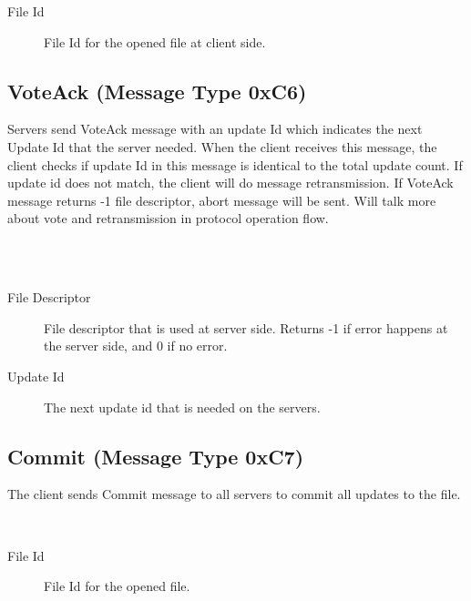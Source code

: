 \documentclass[12pt,fleqn]{article}
\begin{document}
\begin{description}
	\item[File Id] File Id for the opened file at client side.
\end{description}

\subsection{VoteAck (Message Type 0xC6)}
Servers send VoteAck message with an update Id which indicates the next Update Id that the server needed. When the client receives this message, the client checks if update Id in this message is identical to the total update count. If update id does not match, the client will do message retransmission. If VoteAck message returns -1 file descriptor, abort message will be sent. Will talk more about vote and retransmission in protocol operation flow.

\begin{center}
	\begin{bytefield}[bitwidth=1.1em]{16}
		 \\
		 \\
	\end{bytefield}
\end{center}

\begin{description}
	\item[File Descriptor] File descriptor that is used at server side. Returns -1 if error happens at the server side, and 0 if no error.
	\item[Update Id] The next update id that is needed on the servers.
\end{description}

\subsection{Commit (Message Type 0xC7)}
The client sends Commit message to all servers to  commit all updates to the file. 

\begin{center}
	\begin{bytefield}[bitwidth=1.1em]{16}
		 \\
	\end{bytefield}
\end{center}

\begin{description}
	\item[File Id] File Id for the opened file.
\end{description}
\end{document}
